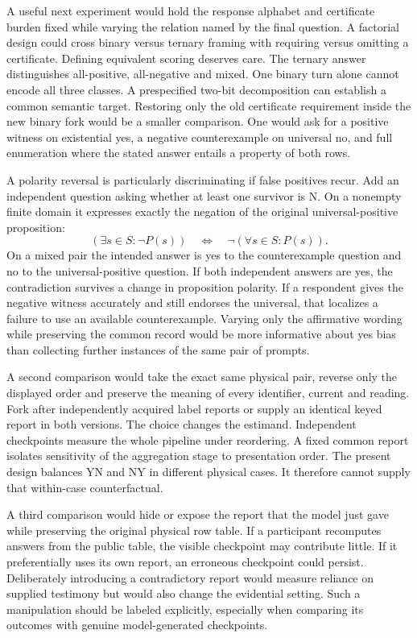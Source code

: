 \documentclass[12pt,letterpaper]{article}
\begin{document}
A useful next experiment would hold the response alphabet and certificate burden fixed while varying the relation named by the final question. A factorial design could cross binary versus ternary framing with requiring versus omitting a certificate. Defining equivalent scoring deserves care. The ternary answer distinguishes all-positive, all-negative and mixed. One binary turn alone cannot encode all three classes. A prespecified two-bit decomposition can establish a common semantic target. Restoring only the old certificate requirement inside the new binary fork would be a smaller comparison. One would ask for a positive witness on existential yes, a negative counterexample on universal no, and full enumeration where the stated answer entails a property of both rows.

A polarity reversal is particularly discriminating if false positives recur. Add an independent question asking whether at least one survivor is N. On a nonempty finite domain it expresses exactly the negation of the original universal-positive proposition:
\[
  (\exists s\in S: \neg P(s))\quad\Longleftrightarrow\quad
          \neg (\forall s\in S: P(s)).
\]
On a mixed pair the intended answer is yes to the counterexample question and no to the universal-positive question. If both independent answers are yes, the contradiction survives a change in proposition polarity. If a respondent gives the negative witness accurately and still endorses the universal, that localizes a failure to use an available counterexample. Varying only the affirmative wording while preserving the common record would be more informative about yes bias than collecting further instances of the same pair of prompts.

A second comparison would take the exact same physical pair, reverse only the displayed order and preserve the meaning of every identifier, current and reading. Fork after independently acquired label reports or supply an identical keyed report in both versions. The choice changes the estimand. Independent checkpoints measure the whole pipeline under reordering. A fixed common report isolates sensitivity of the aggregation stage to presentation order. The present design balances YN and NY in different physical cases. It therefore cannot supply that within-case counterfactual.

A third comparison would hide or expose the report that the model just gave while preserving the original physical row table. If a participant recomputes answers from the public table, the visible checkpoint may contribute little. If it preferentially uses its own report, an erroneous checkpoint could persist. Deliberately introducing a contradictory report would measure reliance on supplied testimony but would also change the evidential setting. Such a manipulation should be labeled explicitly, especially when comparing its outcomes with genuine model-generated checkpoints.
\end{document}
